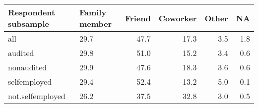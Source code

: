 \begin{table}[ht]
\centering
\begin{tabular}{lL{2cm}rrrr}
  \hline
Respondent subsample & Family member & Friend & Coworker & Other & NA \\ 
  \hline
all & 29.7 & 47.7 & 17.3 & 3.5 & 1.8 \\ 
  audited & 29.8 & 51.0 & 15.2 & 3.4 & 0.6 \\ 
  nonaudited & 29.9 & 47.6 & 18.3 & 3.6 & 0.6 \\ 
  selfemployed & 29.4 & 52.4 & 13.2 & 5.0 & 0.1 \\ 
  not.selfemployed & 26.2 & 37.5 & 32.8 & 3.0 & 0.5 \\ 
   \hline
\end{tabular}
\end{table}
